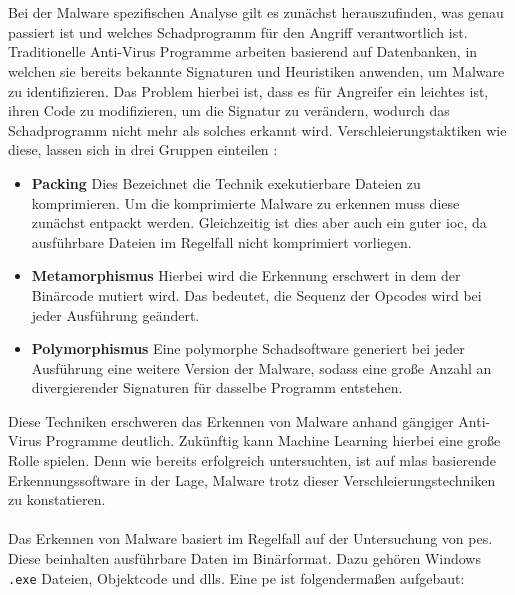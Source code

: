 \documentclass[
    12pt, %
    DIV10,
    ngerman, %
    a4paper, %
    oneside, %
    titlepage, %
    parskip=half, %
    headings=normal, %
    listof=totoc, %
    bibliography=totoc, %
    index=totoc, %
    captions=tableheading, %
    final %
]{scrreprt}
\begin{document}
\\\\
Bei der Malware spezifischen Analyse gilt es zunächst herauszufinden, was genau passiert ist und welches Schadprogramm für den Angriff verantwortlich ist. Traditionelle Anti-Virus Programme arbeiten basierend auf Datenbanken, in welchen sie bereits bekannte Signaturen und Heuristiken anwenden, um Malware zu identifizieren. Das Problem hierbei ist, dass es für Angreifer ein leichtes ist, ihren Code zu modifizieren, um die Signatur zu verändern, wodurch das Schadprogramm nicht mehr als solches erkannt wird. Verschleierungstaktiken wie diese, lassen sich in drei Gruppen einteilen \parencite{he2017model}:
\begin{itemize}
\item \textbf{Packing} Dies Bezeichnet die Technik exekutierbare Dateien zu komprimieren. Um die komprimierte Malware zu erkennen muss diese zunächst entpackt werden. Gleichzeitig ist dies aber auch ein guter \ac{ioc}, da ausführbare Dateien im Regelfall nicht komprimiert vorliegen.
\item \textbf{Metamorphismus} Hierbei wird die Erkennung erschwert in dem der Binärcode mutiert wird. Das bedeutet, die Sequenz der Opcodes wird bei jeder Ausführung geändert.
\item \textbf{Polymorphismus} Eine polymorphe Schadsoftware generiert bei jeder Ausführung eine weitere Version der Malware, sodass eine große Anzahl an divergierender Signaturen für dasselbe Programm entstehen.
\end{itemize}
Diese Techniken erschweren das Erkennen von Malware anhand gängiger Anti-Virus Programme deutlich. Zukünftig kann Machine Learning hierbei eine große Rolle spielen. Denn wie \textcite{Han2019} bereits erfolgreich untersuchten, ist auf \ac{mlas} basierende Erkennungssoftware in der Lage, Malware trotz dieser Verschleierungstechniken zu konstatieren.
\\\\
Das Erkennen von Malware basiert im Regelfall auf der Untersuchung von \ac{pes}. Diese beinhalten ausführbare Daten im Binärformat. Dazu gehören Windows \texttt{.exe} Dateien, Objektcode und \ac{dlls}. Eine \acs{pe} ist folgendermaßen aufgebaut:
\end{document}
